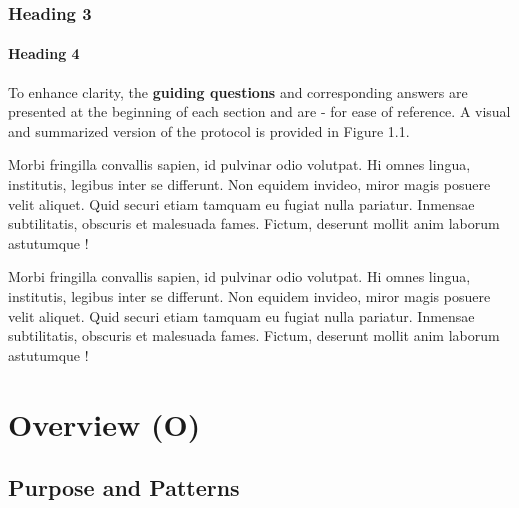 \subsection{Heading 3}

\subsubsection{Heading 4}


To enhance clarity, the \textbf{guiding questions} and corresponding answers are presented at the beginning of each section and are - for ease of reference. A visual and summarized version of the protocol is provided in Figure 1.1.

Morbi fringilla convallis sapien, id pulvinar odio volutpat. Hi omnes lingua, institutis, legibus inter se differunt. Non equidem invideo, miror magis posuere velit aliquet. Quid securi etiam tamquam eu fugiat nulla pariatur. Inmensae subtilitatis, obscuris et malesuada fames. Fictum, deserunt mollit anim laborum astutumque \autocite{grimm2020}!

Morbi fringilla convallis sapien, id pulvinar odio volutpat. Hi omnes lingua, institutis, legibus inter se differunt. Non equidem invideo, miror magis posuere velit aliquet. Quid securi etiam tamquam eu fugiat nulla pariatur. Inmensae subtilitatis, obscuris et malesuada fames. Fictum, deserunt mollit anim laborum astutumque \autocite{grimm2005b}!


\chapter{Overview (O)}

\section{Purpose and Patterns}



